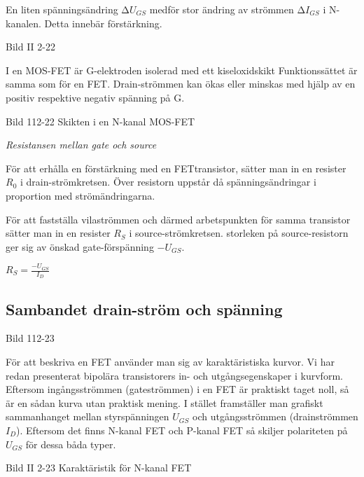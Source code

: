 En liten spänningsändring \(∆U_{GS}\) medför stor ändring av strömmen
\(∆I_{GS}\) i N-kanalen. Detta innebär förstärkning.

Bild II 2-22

I en MOS-FET är G-elektroden isolerad med ett kiseloxidskikt Funktionssättet är
samma som för en FET. Drain-strömmen kan ökas eller minskas med hjälp av en
positiv respektive negativ spänning på G.

Bild 112-22 Skikten i en N-kanal MOS-FET

\emph{Resistansen mellan gate och source}

För att erhålla en förstärkning med en FETtransistor, sätter man in en resister
\(R_0\) i drain-strömkretsen. Över resistorn uppstår då spänningsändringar i
proportion med strömändringarna.

För att fastställa vilaströmmen och därmed arbetspunkten för samma transistor
sätter man in en resister \(R_S\) i source-strömkretsen. storleken på
source-resistorn ger sig av önskad gate-förspänning \(-U_{GS}\).

\(R_S = \frac{-U_{GS}}{I_D}\)

\subsection{Sambandet drain-ström och spänning}

Bild 112-23

För att beskriva en FET använder man sig av karaktäristiska kurvor. Vi har redan
presenterat bipolära transistorers in- och utgångsegenskaper i kurvform.
Eftersom ingångsströmmen (gateströmmen) i en FET är praktiskt taget noll, så är
en sådan kurva utan praktisk mening. I stället framställer man grafiskt
sammanhanget mellan styrspänningen \(U_{GS}\) och utgångsströmmen (drainströmmen
\(I_D\)). Eftersom det finns N-kanal FET och P-kanal FET så skiljer polariteten
på \(U_{GS}\) för dessa båda typer.

Bild II 2-23 Karaktäristik för N-kanal FET
